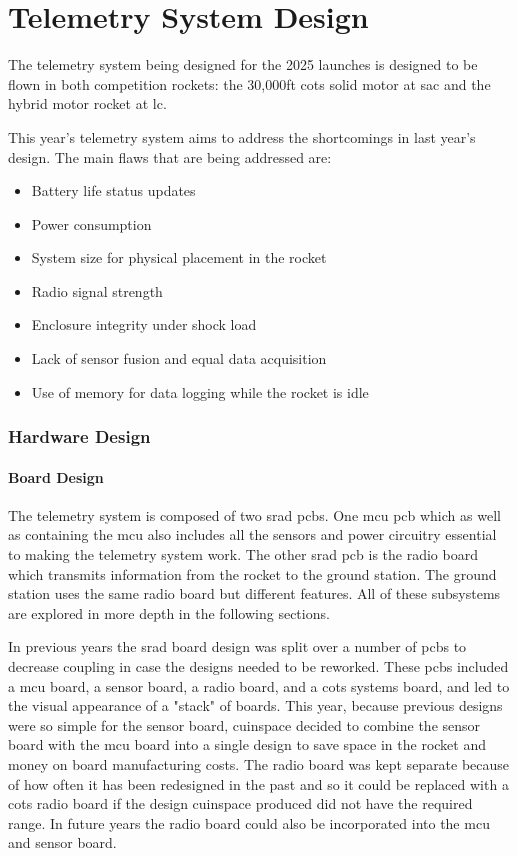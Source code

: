 \part{Telemetry System Design}

The telemetry system being designed for the 2025 launches is designed to be flown in both competition rockets: the
30,000ft \gls{cots} solid motor at \gls{sac} and the hybrid motor rocket at \gls{lc}.

This year's telemetry system aims to address the shortcomings in last year's design. The main flaws that are being
addressed are:

\begin{itemize}
    \item Battery life status updates
    \item Power consumption
    \item System size for physical placement in the rocket
    \item Radio signal strength
    \item Enclosure integrity under shock load
    \item Lack of sensor fusion and equal data acquisition
    \item Use of memory for data logging while the rocket is idle
\end{itemize}

\section{Hardware Design}

\subsection{Board Design}

The telemetry system is composed of two \gls{srad} \gls{pcb}s. One \gls{mcu} \gls{pcb} which as well as containing the
\gls{mcu} also includes all the sensors and power circuitry essential to making the telemetry system work. The other
\gls{srad} \gls{pcb} is the radio board which transmits information from the rocket to the ground station. The ground 
station uses the same radio board but different features. All of these subsystems are explored in more depth in the 
following sections.

In previous years the \gls{srad} board design was split over a number of \glspl{pcb} to decrease coupling in case the
designs needed to be reworked. These \glspl{pcb} included a \gls{mcu} board, a sensor board, a radio board,
and a \gls{cots} systems board, and led to the visual appearance of a "stack" of boards. This year, because previous
designs were so simple for the sensor board, \gls{cuinspace} decided to combine the sensor board with the \gls{mcu} board
into a single design to save space in the rocket and money on board manufacturing costs. The radio board was kept 
separate because of how often it has been redesigned in the past and so it could be replaced with a \gls{cots} radio
board if the design \gls{cuinspace} produced did not have the required range. In future years the radio board could also
be incorporated into the \gls{mcu} and sensor board.

